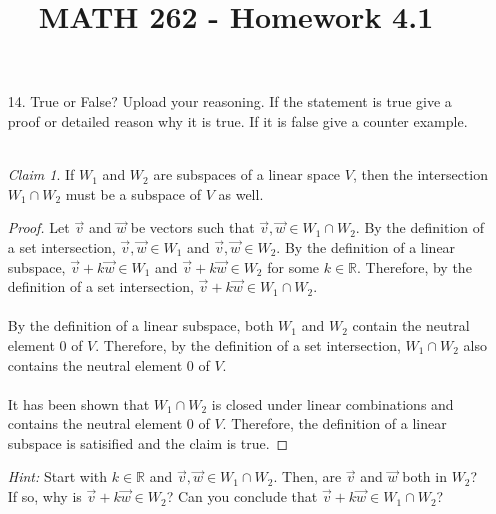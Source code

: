 \documentclass[letterpaper,12pt]{article}
\author{}
\title{MATH 262 - Homework 4.1}
\date{} %
\theoremstyle{remark}
\newtheorem*{claim}{Claim}
\begin{document}
\maketitle

\begin{enumerate}
  \item[14.]
    True or False? Upload your reasoning. If the statement is true give a proof or detailed reason why it is true. If it is false give a counter example. \\
    \\
    \begin{claim}
      If $W_1$ and $W_2$ are subspaces of a linear space $V$, then the intersection $W_1 \cap W_2$ must be a subspace of $V$ as well.
    \end{claim}
    \begin{proof}
      Let $\vec{v}$ and $\vec{w}$ be vectors such that $\vec{v}, \vec{w} \in W_1 \cap W_2$. By the definition of a set intersection, $\vec{v}, \vec{w} \in W_1$ and $\vec{v}, \vec{w} \in W_2$. By the definition of a linear subspace, $\vec{v} + k\vec{w} \in W_1$ and $\vec{v} + k\vec{w} \in W_2$ for some $k \in \mathbb{R}$. Therefore, by the definition of a set intersection, $\vec{v} + k\vec{w} \in W_1 \cap W_2$. \\
      \\
      By the definition of a linear subspace, both $W_1$ and $W_2$ contain the neutral element 0 of $V$. Therefore, by the definition of a set intersection, $W_1 \cap W_2$ also contains the neutral element $0$ of $V$. \\
      \\
      It has been shown that $W_1 \cap W_2$ is closed under linear combinations and contains the neutral element 0 of $V$. Therefore, the definition of a linear subspace is satisified and the claim is true.
    \end{proof}
    \textit{Hint:} Start with $k \in \mathbb{R}$ and $\vec{v}, \vec{w} \in W_1 \cap W_2$. Then, are $\vec{v}$ and $\vec{w}$ both in $W_2$? If so, why is $\vec{v} + k\vec{w} \in W_2$? Can you conclude that $\vec{v} + k\vec{w} \in W_1 \cap W_2$?
\end{enumerate}
\end{document}

